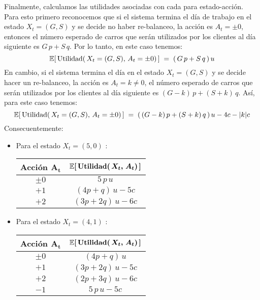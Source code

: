\documentclass[ a4paper, twoside, 11pt]{article}
\begin{document}
\begin{problem}
Finalmente, calculamos las utilidades asociadas con cada para estado-acci\'on. Para esto primero reconocemos que si el sistema termina el d\'ia de trabajo en el estado $X_t = (G,S)$ y se decide no haber re-balanceo, \ie la acci\'on es $A_t = \pm 0$, entonces el n\'umero esperado de carros que ser\'an utilizados por los clientes al d\'ia siguiente es $G \, p + S \, q$. Por lo tanto, en este caso tenemos: 
\[
\mathbb{E}[ \, \text{Utilidad}( \, X_t = (G,S) , \, A_t = \pm 0 ) \, ]
\; = \; ( \, G \, p + S \, q \, ) \, u
\]
En cambio, si el sistema termina el d\'ia en el estado $X_t = (G,S)$ y se decide hacer un re-balanceo, \ie la acci\'on es $A_t = k \neq 0$, el n\'umero esperado de carros que ser\'an utilizados por los clientes al d\'ia siguiente es $(G-k) \, p + (S+k) \, q$. As\'i, para este caso tenemos: 
\[
\mathbb{E}[ \, \text{Utilidad}( \, X_t = (G,S) , \, A_t = \pm 0 ) \, ]
\; = \; ( \, (G-k) \, p + (S+k) \, q \, ) \, u - 4c - |k|c
\]
Consecuentemente: 
\begin{itemize}
\item Para el estado $X_t = (5,0)$ :
\begin{table}[H]
\centering
\begin{tabular}{|c|c|}
\hline
\textbf{Acci\'on} $\boldsymbol{A_t}$
& $\boldsymbol{ \mathbb{E}[ \, \textbf{Utilidad}( \, X_t, \, A_t ) \, ]}$ \\ \hline
$\pm 0$ & $5 \, p \, u$ \\ \hline
$+1$ & $( 4p + q ) \, u - 5c$ \\ \hline
$+2$ & $( 3p + 2q ) \, u - 6c$ \\ \hline
\end{tabular}
\end{table}
\item Para el estado $X_t = (4,1)$ :
\begin{table}[H]
\centering
\begin{tabular}{|c|c|}
\hline
\textbf{Acci\'on} $\boldsymbol{A_t}$
& $\boldsymbol{ \mathbb{E}[ \, \textbf{Utilidad}( \, X_t, \, A_t ) \, ]}$ \\ \hline
$\pm 0$ & $( 4p + q ) \, u$ \\ \hline
$+1$ & $( 3p + 2q ) \, u - 5c$ \\ \hline
$+2$ & $( 2p + 3q ) \, u - 6c$ \\ \hline
$-1$ & $5 \, p \, u - 5c$ \\ \hline
\end{tabular}

\end{table}
\end{itemize}
\end{problem}
\end{document}

